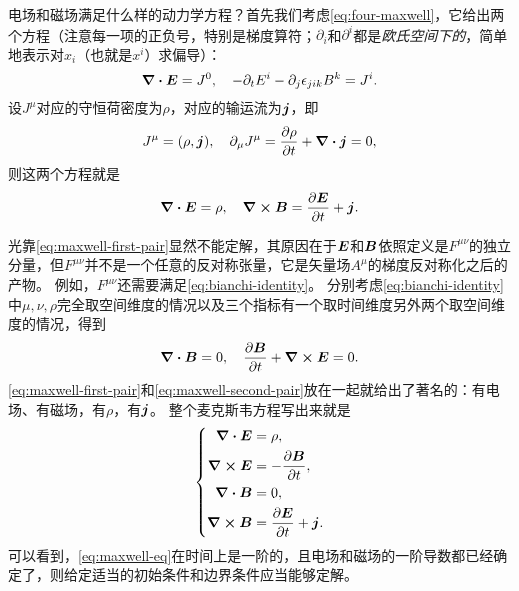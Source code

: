 电场和磁场满足什么样的动力学方程？首先我们考虑\eqref{eq:four-maxwell}，它给出两个方程（注意每一项的正负号，特别是梯度算符；$\partial_i$和$\partial^i$都是\emph{欧氏空间下的}，简单地表示对$x_i$（也就是$x^i$）求偏导）：
\[
    \div{\vb*{E}} = J^0, \quad - \partial_t E^i - \partial_j \epsilon_{jik} B^k = J^i.
\]
设$J^\mu$对应的守恒荷密度为$\rho$，对应的输运流为$\vb*{j}$，即
\begin{equation}
    J^\mu = (\rho, \vb*{j}), \quad \partial_\mu J^\mu = \pdv{\rho}{t} + \div{\vb*{j}} = 0,
\end{equation}
则这两个方程就是
\begin{equation}
    \div{\vb*{E}} = \rho, \quad \curl{\vb*{B}} = \pdv{\vb*{E}}{t} + \vb*{j}.
    \label{eq:maxwell-first-pair}
\end{equation}

光靠\eqref{eq:maxwell-first-pair}显然不能定解，其原因在于$\vb*{E}$和$\vb*{B}$依照定义是$F^{\mu \nu}$的独立分量，但$F^{\mu \nu}$并不是一个任意的反对称张量，它是矢量场$A^\mu$的梯度反对称化之后的产物。
例如，$F^{\mu \nu}$还需要满足\eqref{eq:bianchi-identity}。
分别考虑\eqref{eq:bianchi-identity}中$\mu, \nu, \rho$完全取空间维度的情况以及三个指标有一个取时间维度另外两个取空间维度的情况，得到
\begin{equation}
    \div{\vb*{B}} = 0, \quad \pdv{\vb*{B}}{t} + \curl{\vb*{E}} = 0.
    \label{eq:maxwell-second-pair}
\end{equation}
\eqref{eq:maxwell-first-pair}和\eqref{eq:maxwell-second-pair}放在一起就给出了著名的：有电场、有磁场，有$\rho$，有$\vb*{j}$。
整个麦克斯韦方程写出来就是
\begin{equation}
    \left\{
        \begin{aligned}
            \div{\vb*{E}} &= \rho, \\
            \curl{\vb*{E}} &= - \pdv{\vb*{B}}{t}, \\
            \div{\vb*{B}} &= 0, \\
            \curl{\vb*{B}} &= \pdv{\vb*{E}}{t} + \vb*{j}.
        \end{aligned}
    \right.
    \label{eq:maxwell-eq}
\end{equation}
可以看到，\eqref{eq:maxwell-eq}在时间上是一阶的，且电场和磁场的一阶导数都已经确定了，则给定适当的初始条件和边界条件应当能够定解。

